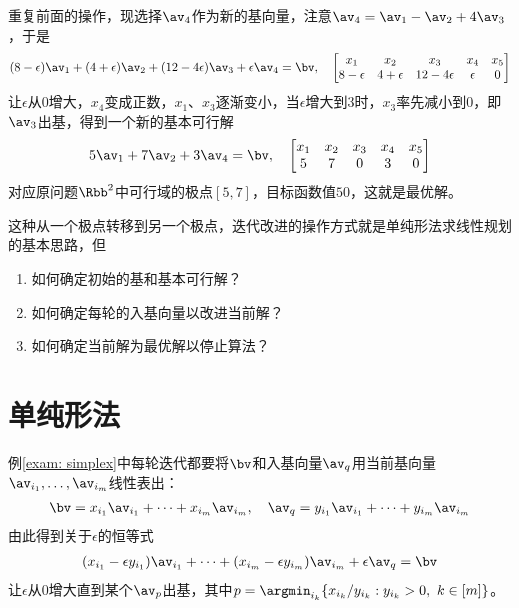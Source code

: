 \documentclass{ctexart}
\begin{document}
\begin{example}
    重复前面的操作，现选择$\av_4$作为新的基向量，注意$\av_4 = \av_1 - \av_2 + 4 \av_3$，于是
    \begin{align*}
        (8 - \epsilon) \av_1 + (4 + \epsilon) \av_2 + (12 - 4 \epsilon) \av_3 + \epsilon \av_4 = \bv, \quad
        \begin{bmatrix}
            x_1          & x_2          & x_3             & x_4      & x_5 \\
            8 - \epsilon & 4 + \epsilon & 12 - 4 \epsilon & \epsilon & 0
        \end{bmatrix}
    \end{align*}
    让$\epsilon$从$0$增大，$x_4$变成正数，$x_1$、$x_3$逐渐变小，当$\epsilon$增大到$3$时，$x_3$率先减小到$0$，即$\av_3$出基，得到一个新的基本可行解
    \begin{align*}
        5 \av_1 + 7 \av_2 + 3 \av_4 = \bv, \quad
        \begin{bmatrix}
            x_1 & x_2 & x_3 & x_4 & x_5 \\
            5   & 7   & 0   & 3   & 0
        \end{bmatrix}
    \end{align*}
    对应原问题$\Rbb^2$中可行域的极点$[5,7]$，目标函数值$50$，这就是最优解。
\end{example}

\begin{remark}
    这种从一个极点转移到另一个极点，迭代改进的操作方式就是单纯形法求线性规划的基本思路，但
    \begin{enumerate}
        \item 如何确定初始的基和基本可行解？
        \item 如何确定每轮的入基向量以改进当前解？
        \item 如何确定当前解为最优解以停止算法？
    \end{enumerate}
\end{remark}

\section{单纯形法}

例\ref{exam: simplex}中每轮迭代都要将$\bv$和入基向量$\av_q$用当前基向量$\av_{i_1}, \ldots, \av_{i_m}$线性表出：
\begin{align*}
    \bv = x_{i_1} \av_{i_1} + \cdots + x_{i_m} \av_{i_m}, \quad \av_q = y_{i_1} \av_{i_1} + \cdots + y_{i_m} \av_{i_m}
\end{align*}
由此得到关于$\epsilon$的恒等式
\begin{align*}
    (x_{i_1} - \epsilon y_{i_1}) \av_{i_1} + \cdots + (x_{i_m} - \epsilon y_{i_m}) \av_{i_m} + \epsilon \av_q = \bv
\end{align*}
让$\epsilon$从$0$增大直到某个$\av_p$出基，其中$p = \argmin_{i_k} \{ x_{i_k} / y_{i_k} : y_{i_k} > 0, ~ k \in [m] \}$。
\end{document}
